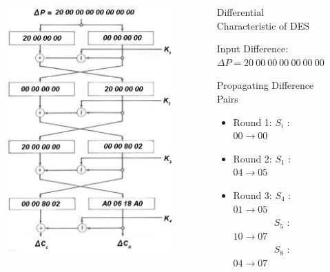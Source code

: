\documentclass[9pt]{beamer}
\begin{document}
\begin{frame}
\begin{columns}
\begin{column}{0.4\textwidth}
\begin{figure}
\includegraphics[totalheight=0.8\textheight]{des_diff_char.jpg}
\end{figure}
\end{column}

\begin{column}{0.6\textwidth}
Differential Characteristic of DES

\vspace{5mm}
Input Difference: $\Delta P = 20\:00\:00\:00\:00\:00\:00\:00$

\vspace{5mm}
\pause Propagating Difference Pairs
\begin{itemize}[<+->]
\item{Round 1: $S_i$ : $00 \rightarrow 00$}
\item{Round 2: $S_1$ : $04 \rightarrow 05$}
\item{Round 3: $S_4$ : $01 \rightarrow 05$ \\ $\qquad \qquad \: S_5$ : $10 \rightarrow 07$ \\ $\qquad \qquad \: S_8$ : $04 \rightarrow 07$}
\end{itemize}


\end{column}
\end{columns}
\end{frame}
\end{document}
